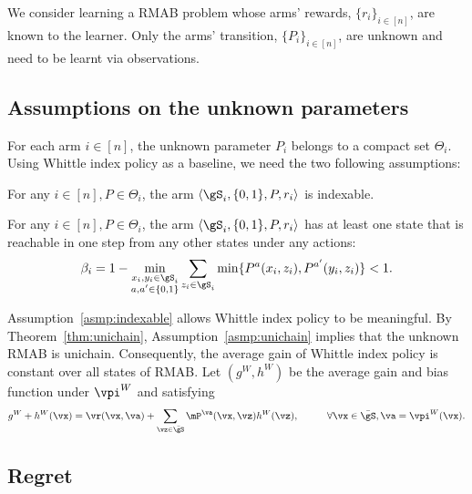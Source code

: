 We consider learning a RMAB problem whose arms' rewards, $\{r_i\}_{i\in[n]}$, are known to the learner.
Only the arms' transition, $\{P_i\}_{i\in[n]}$, are unknown and need to be learnt via observations.

\subsection{Assumptions on the unknown parameters}

For each arm $i\in[n]$, the unknown parameter $P_i$ belongs to a compact set $\Theta_i$.
Using Whittle index policy as a baseline, we need the two following assumptions:
\begin{asmp}
    \label{asmp:indexable}
    For any $i\in[n], P\in\Theta_i$, the arm $\langle\gS_i,\{0,1\},P,r_i\rangle$ is indexable.
\end{asmp}
\begin{asmp}
    \label{asmp:unichain}
    For any $i\in[n], P\in\Theta_i$, the arm $\langle\gS_i,\{0,1\},P,r_i\rangle$ has at least one state that is reachable in one step from any other states under any actions:
    \begin{align*}
        \beta_i = 1-\min_{\substack{x_i,y_i\in\gS_i \\a,a'\in\{0,1\}}} \sum_{z_i\in\gS_i} \min\{P^{a}(x_i,z_i), P^{a'}(y_i,z_i)\}<1.
    \end{align*}
\end{asmp}

Assumption~\ref{asmp:indexable} allows Whittle index policy to be meaningful.
By Theorem~\ref{thm:unichain}, Assumption~\ref{asmp:unichain} implies that the unknown RMAB is unichain. Consequently, the average gain of Whittle index policy is constant over all states of RMAB.
Let $(g^W, h^W)$ be the average gain and bias function under $\vpi^W$ and satisfying
\begin{align}
    g^W + h^W(\vx) = \vr(\vx,\va) +\sum_{\vz\in\bar{\gS}} \mP^{\va}(\vx, \vz)h^W(\vz),\hspace{1cm} \forall \vx\in\bar{\gS}, \va=\vpi^W(\vx). \label{eq:bellman}
\end{align}

\subsection{Regret}
\label{ssec:regret}

